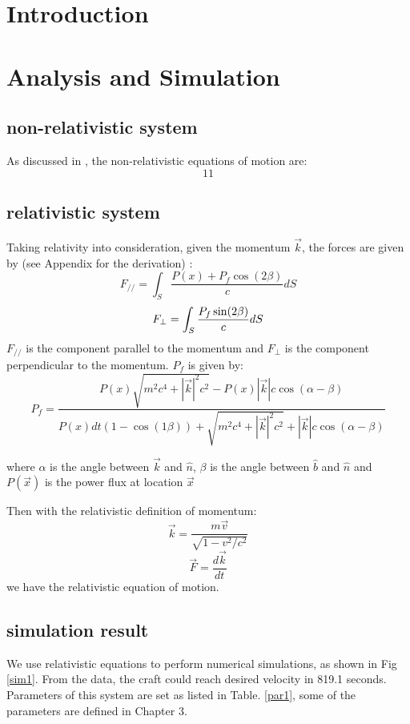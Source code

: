 \documentclass{article}
\begin{document}
\section{Introduction}
\section{Analysis and Simulation}
\subsection{non-relativistic system}
As discussed in \cite{}, the non-relativistic equations of motion are:
\begin{equation}
	11
\end{equation}
\subsection{relativistic system}
Taking relativity into consideration, given the momentum $\vec{k}$, the forces are given by (see Appendix for the derivation) :
\begin{equation}
	F_{//}=\int_S \frac{P(x) +P_f \cos (2\beta) }{c} dS 
\end{equation}
\begin{equation}
	F_{\perp}=\int_S \frac{P_f \sin (2\beta)}{c} dS \\
\end{equation}
$F_{//}$ is the component parallel to the momentum and $F_\perp$ is the component perpendicular to the momentum.
$P_f$ is given by:
\begin{equation}
	P_f=\frac{P(x) \sqrt{m^2c^4+|\vec{k}|^2c^2 } - P(x)|\vec{k}|c \cos(\alpha- \beta) }{P(x)dt (1-\cos(1\beta)) +\sqrt{m^2c^4+|\vec{k}|^2c^2 } + |\vec{k}|c \cos(\alpha- \beta) }
\end{equation}

where $\alpha$ is the angle between $\vec{k}$ and $\hat{n}$, $\beta$ is the angle between $\hat{b}$ and $\hat{n}$ and $P(\vec x)$ is the power flux at location $\vec x$

Then with the relativistic definition of momentum:
\begin{equation}
	\vec k = \frac{m \vec v}{\sqrt{1-v^2/c^2}}
\end{equation}
\begin{equation}
	\vec{F} = \frac{d \vec k}{dt}
\end{equation}
we have the relativistic equation of motion. 

\subsection{simulation result}
We use relativistic equations to perform numerical simulations, as shown in Fig \ref{sim1}. From the data, the craft could reach desired velocity in 819.1 seconds. Parameters of this system are set as listed in Table. \ref{par1}, some of the parameters are defined in Chapter 3.
\end{document}
